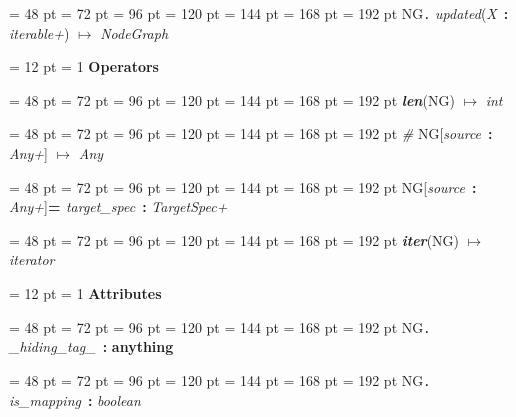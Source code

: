 {{{{\par \noindent  \leftskip = 48 pt  \leftmargini = 72 pt  \leftmarginii = 96 pt  \leftmarginiii = 120 pt  \leftmarginiv = 144 pt  \leftmarginv = 168 pt  \leftmarginvi = 192 pt NG{\large {\tt .\/} {\em updated\/}}({\em X\/}~{\bf :}  {\em iterable+\/}) \(\mapsto \)  {\em NodeGraph\/}\par}
{\par \pagebreak[3.200000] \noindent \hangindent = 12 pt \hangafter = 1 
{\bf {\large {\bf Operators\/}}\/}\par}
{\par \noindent  \leftskip = 48 pt  \leftmargini = 72 pt  \leftmarginii = 96 pt  \leftmarginiii = 120 pt  \leftmarginiv = 144 pt  \leftmarginv = 168 pt  \leftmarginvi = 192 pt  {\em {\large {\bf len\/}}\/}(NG) \(\mapsto \)  {\em int\/}\par}
{\par \noindent  \leftskip = 48 pt  \leftmargini = 72 pt  \leftmarginii = 96 pt  \leftmarginiii = 120 pt  \leftmarginiv = 144 pt  \leftmarginv = 168 pt  \leftmarginvi = 192 pt  {\em {\#} \/}NG{[}{\em source\/}~{\bf :}  {\em Any+\/}] \(\mapsto \)  {\em Any\/}\par}
{\par \noindent  \leftskip = 48 pt  \leftmargini = 72 pt  \leftmarginii = 96 pt  \leftmarginiii = 120 pt  \leftmarginiv = 144 pt  \leftmarginv = 168 pt  \leftmarginvi = 192 pt NG{[}{\em source\/}~{\bf :}  {\em Any+\/}]{\bf {\large {\bf  = \/}}\/}{\em target{\_}spec\/}~{\bf :}  {\em TargetSpec+\/}\par}
{\par \noindent  \leftskip = 48 pt  \leftmargini = 72 pt  \leftmarginii = 96 pt  \leftmarginiii = 120 pt  \leftmarginiv = 144 pt  \leftmarginv = 168 pt  \leftmarginvi = 192 pt  {\em {\large {\bf iter\/}}\/}(NG) \(\mapsto \)  {\em iterator\/}\par}
{\par \pagebreak[3.200000] \noindent \hangindent = 12 pt \hangafter = 1 
{\bf {\large {\bf Attributes\/}}\/}\par}
{\par \noindent  \leftskip = 48 pt  \leftmargini = 72 pt  \leftmarginii = 96 pt  \leftmarginiii = 120 pt  \leftmarginiv = 144 pt  \leftmarginv = 168 pt  \leftmarginvi = 192 pt NG{\large {\tt .\/} {\em {\_}hiding{\_}tag{\_}\/}}~{\bf :} {\bf  anything\/}\par}
{\par \noindent  \leftskip = 48 pt  \leftmargini = 72 pt  \leftmarginii = 96 pt  \leftmarginiii = 120 pt  \leftmarginiv = 144 pt  \leftmarginv = 168 pt  \leftmarginvi = 192 pt NG{\large {\tt .\/} {\em is{\_}mapping\/}}~{\bf :}  {\em boolean\/}\par}
}}}
